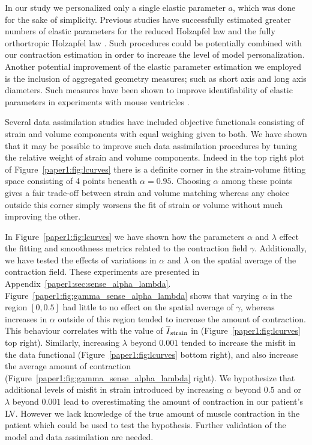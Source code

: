 In our study we personalized only a single elastic parameter $a$, which was done for the sake of simplicity.
Previous studies have successfully estimated greater numbers of elastic parameters for the reduced Holzapfel
law \cite{asner2015estimation} and the fully orthortropic Holzapfel law \cite{gao2015parameter}.
Such procedures could be potentially combined with our 
contraction estimation in order to increase the level of model personalization.
Another potential improvement of the elastic parameter estimation we employed 
is the inclusion of aggregated geometry measures;
such as short axis and long axis diameters. Such measures have been shown
to improve identifiability of elastic parameters in experiments
with mouse ventricles \cite{nordbo2014computational}.


Several data assimilation studies \cite{mojsejenko2014estimating,
  sun2009computationally} have included objective functionals
consisting of strain and volume components with equal weighing given
to both. We have shown that it may be possible to improve such data
assimilation procedures by tuning the relative weight of strain and
volume components. Indeed in the top right plot of Figure~\ref{paper1:fig:lcurves} there is 
a definite corner in the strain-volume fitting space consisting of 4 points
beneath $\alpha = 0.95$. Choosing $\alpha$ among these points gives
a fair trade-off between strain and volume matching whereas any choice outside this
corner simply worsens the fit of strain or volume without much improving the other.

In Figure~\ref{paper1:fig:lcurves} we have shown how the parameters $\alpha$
and $\lambda$ effect the fitting and smoothness 
 metrics related to the contraction field $\gamma$. Additionally, we have
tested the effects of variations in $\alpha$ and $\lambda$ on the spatial
average of the contraction field. These experiments are presented in Appendix~\ref{paper1:sec:sense_alpha_lambda}.
Figure~\ref{paper1:fig:gamma_sense_alpha_lambda} shows that varying $\alpha$ in the region $[0, 0.5]$ had little to no effect on the spatial average of
$\gamma$, whereas increases in $\alpha$ outside of this region tended to increase the amount of 
contraction. This behaviour correlates with the value of $\overline{I}_{\text{strain}}$ in (Figure~\ref{paper1:fig:lcurves}
top right). Similarly, increasing $\lambda$ beyond $0.001$ tended to increase the misfit in the data 
functional (Figure~\ref{paper1:fig:lcurves} bottom right), and also increase the average amount of
contraction (Figure~\ref{paper1:fig:gamma_sense_alpha_lambda} right).
We hypothesize that additional levels of misfit in strain introduced by increasing
$\alpha$ beyond $0.5$ and or $\lambda$ beyond $0.001$ lead to overestimating 
the amount of contraction in our patient's LV. However we lack knowledge of the
true amount of muscle contraction in the patient which could be used to test the hypothesis.
Further validation of the model and data assimilation are needed.


